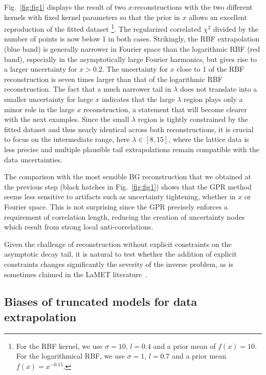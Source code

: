 \documentclass[aps,prl,groupedaddress,twocolumn,superscriptaddress,amsfonts,amssymb,amsmath,showpacs,floatfix,preprintnumbers]{revtex4-2}
\begin{document}
Fig.~\ref{fig:fig1} displays the result of two $x$-reconstructions with the two different kernels with fixed kernel parameters so that the prior in $x$ allows an excellent reproduction of the fitted dataset \footnote{For the RBF kernel, we use $\sigma = 10$, $l = 0.4$ and a prior mean of $f(x) = 10$. For the logarithmical RBF, we use $\sigma = 1$, $l = 0.7$ and a prior mean $f(x) = x^{-0.15}$.}. The regularized correlated $\chi^2$ divided by the number of points is now below 1 in both cases. Strikingly, the RBF extrapolation (blue band) is generally narrower in Fourier space than the logarithmic RBF (red band), especially in the asymptotically large Fourier harmonics, but gives rise to a larger uncertainty for $x > 0.2$. The uncertainty for $x$ close to 1 of the RBF reconstruction is seven times larger than that of the logarithmic RBF reconstruction. The fact that a much narrower tail in $\lambda$ does not translate into a smaller uncertainty for large $x$ indicates that the large $\lambda$ region plays only a minor role in the large $x$ reconstruction, a statement that will become clearer with the next examples. 
Since the small $\lambda$ region is tightly constrained by the fitted dataset and thus nearly identical across both reconstructions, it is crucial to focus on the intermediate range, here $\lambda \in [8, 15]$, where the lattice data is less precise and multiple plausible tail extrapolations remain compatible with the data uncertainties. 

The comparison with the most sensible BG reconstruction that we obtained at the previous step (black hatches in Fig.~\ref{fig:fig1}) shows that the GPR method seems less sensitive to artifacts such as uncertainty tightening, whether in $x$ or Fourier space. This is not surprising since the GPR precisely enforces a requirement of correlation length, reducing the creation of uncertainty nodes which result from strong local anti-correlations.

Given the challenge of reconstruction without explicit constraints on the asymptotic decay tail, it is natural to test whether the addition of explicit constraints changes significantly the severity of the inverse problem, as is sometimes claimed in the LaMET literature~\cite{Gao:2021dbh,Ji:2022ezo}.

\subsection{Biases of truncated models for data extrapolation}
\end{document}
